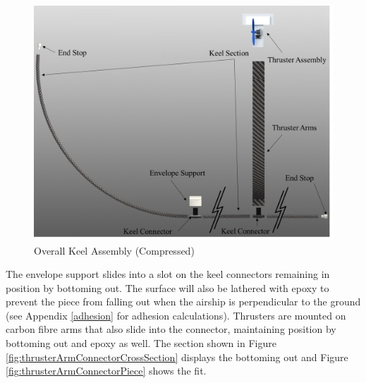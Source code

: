 \documentclass[../main.tex]{subfiles}
\begin{document}
\begin{figure}[H]
	\centering
	\includegraphics[width=.8\linewidth]{img/design/keel/keelAssemblyCompressedThruster.png}
	\caption{Overall Keel Assembly (Compressed)}
	\label{fig:keelAssemblyCompressedThruster}
\end{figure}

The envelope support slides into a slot on the keel connectors remaining in position by bottoming out. The surface will also be lathered with epoxy to prevent the piece from falling out when the airship is perpendicular to the ground (see Appendix \ref{adhesion} for adhesion calculations). Thrusters are mounted on carbon fibre arms that also slide into the connector, maintaining position by bottoming out and epoxy as well. The section shown in Figure \ref{fig:thrusterArmConnectorCrossSection} displays the bottoming out and Figure \ref{fig:thrusterArmConnectorPiece} shows the fit.
\end{document}
